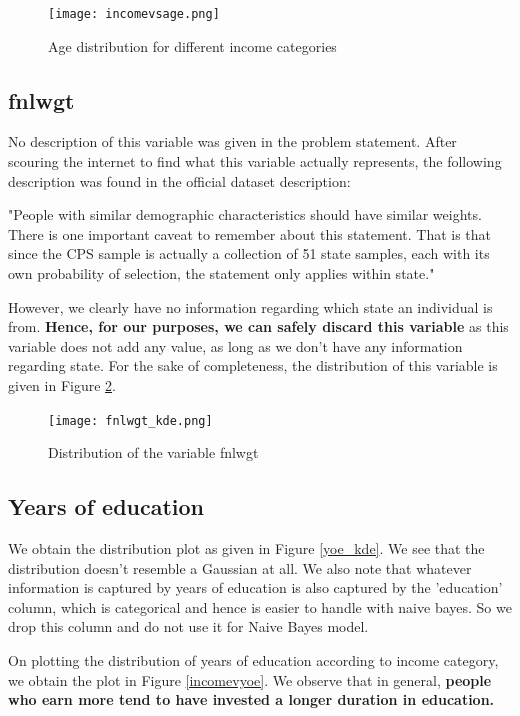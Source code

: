 \documentclass[conference]{IEEEtran}
\begin{document}
\begin{figure}[tbh]
\centering
\texttt{[image: incomevsage.png]}
\caption{Age distribution for different income categories}
\label{incomevsage}
\end{figure}


\subsection*{fnlwgt}

No description of this variable was given in the problem statement. After scouring the internet to find what this variable actually represents, the following description was found in the official dataset description:

"People with similar demographic characteristics should have similar weights.  There is one important caveat to remember about this statement.  That is that since the CPS sample is actually a collection of 51 state samples, each with its own probability of selection, the statement only applies within state."

However, we clearly have no information regarding which state an individual is from. \textbf{Hence, for our purposes, we can safely discard this variable} as this variable does not add any value, as long as we don't have any information regarding state. For the sake of completeness, the distribution of this variable is given in Figure \ref{fnlwgt_kde}.

\begin{figure}[tbh]
\centering
\texttt{[image: fnlwgt\_kde.png]}
\caption{Distribution of the variable fnlwgt}
\label{fnlwgt_kde}
\end{figure}

\subsection*{Years of education}

We obtain the distribution plot as given in Figure \ref{yoe_kde}. We see that the distribution doesn't resemble a Gaussian at all. We also note that whatever information is captured by years of education is also captured by the 'education' column, which is categorical and hence is easier to handle with naive bayes. So we drop this column and do not use it for Naive Bayes model.

On plotting the distribution of years of education according to income category, we obtain the plot in Figure \ref{incomevyoe}. We observe that in general, \textbf{people who earn more tend to have invested a longer duration in education.}
\end{document}
